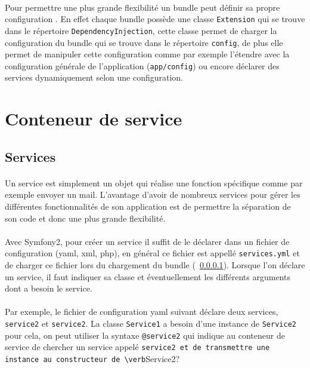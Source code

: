 \paragraph{}
\label{configuration}
Pour permettre une plus grande flexibilité un bundle peut définir sa propre configuration . En effet chaque bundle possède une classe \verb?Extension? qui se trouve dans le répertoire \verb?DependencyInjection?, cette classe permet de charger la configuration du bundle qui se trouve dans le répertoire \verb?config?, de plus elle permet de manipuler cette configuration comme par exemple l'étendre avec la configuration générale de l'application (\verb?app/config?) ou encore déclarer des services dynamiquement selon une configuration.
\section{Conteneur de service}

\subsection{Services}
\paragraph{}
Un service est simplement un objet qui réalise une fonction spécifique comme par exemple envoyer un mail. L'avantage d'avoir de nombreux services pour gérer les différentes fonctionnalités de son application est de permettre la séparation de son code et donc une plus grande flexibilité.
\paragraph{}
Avec Symfony2, pour créer un service il suffit de le déclarer dans un fichier de configuration (yaml, xml, php), en général ce fichier est appellé \verb?services.yml?
et de charger ce fichier lors du chargement du bundle (~\ref{configuration}).
Lorsque l'on déclare un service, il faut indiquer sa classe et éventuellement les différents arguments dont a besoin le service.
\paragraph{}
Par exemple, le fichier de configuration yaml suivant déclare deux services, \verb?service2? et \verb?service2?.
La classe \verb?Service1? a besoin d'une instance de \verb?Service2? pour cela, on peut utiliser la syntaxe \verb?@service2? qui indique au conteneur de service de chercher un service appelé \verb?service2 et de transmettre une instance au constructeur de \verb?Service2?

